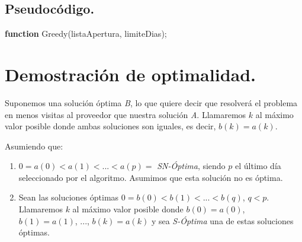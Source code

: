 \documentclass[11pt,a4paper]{article}
\begin{document}
		\subsection{Pseudocódigo.}

				\begin{algorithm}[H]

					\textbf{function} Greedy(listaApertura, limiteDias);


				\end{algorithm}

\newpage

	\section{Demostración de optimalidad.}

		\par
		Suponemos una solución óptima \textit{B}, lo que quiere decir que resolverá el problema en menos visitas al proveedor que nuestra solución \textit{A}. Llamaremos $k$ al máximo valor posible donde ambas soluciones son iguales, es decir, $b(k) = a(k)$.

		\par
		Asumiendo que:

		\begin{enumerate}

			\item
			$0 = a(0) < a(1) < ... < a(p) = $ \textit{SN-Óptima}, siendo $p$ el último día seleccionado por el algoritmo. Asumimos que esta solución no es óptima.

			\item
			Sean las soluciones óptimas $0 = b(0) < b(1) < ... < b(q)$, $q<p$. Llamaremos $k$ al máximo valor posible donde $b(0) = a(0)$, $b(1) = a(1)$, ..., $b(k) = a(k)$ y sea \textit{S-Óptima} una de estas soluciones óptimas. 

		\end{enumerate}
\end{document}
